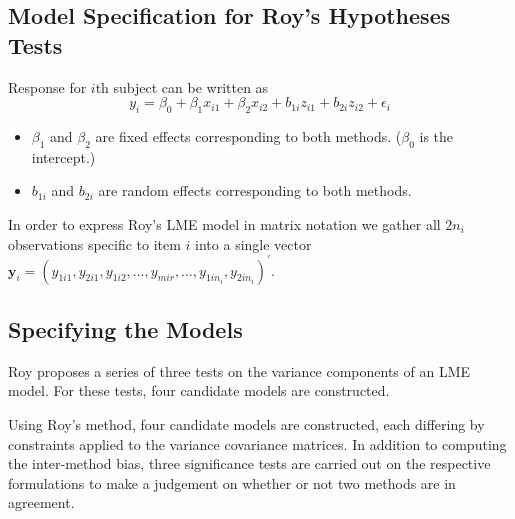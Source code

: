 \documentclass[12pt, a4paper]{report}
\theoremstyle{plain}
\theoremstyle{definition}
\theoremstyle{remark}
\begin{document}

	\subsection{Model Specification for Roy's Hypotheses Tests}
	
	Response for $i$th subject can be written as
	\[ y_i = \beta_0 + \beta_1x_{i1} + \beta_2x_{i2} + b_{1i}z_{i1}  + b_{2i}z_{i2} + \epsilon_i \]
	\begin{itemize}
		\item $\beta_1$ and $\beta_2$ are fixed effects corresponding to both methods. ($\beta_0$ is the intercept.)
		\item $b_{1i}$ and $b_{2i}$ are random effects corresponding to both methods.
	\end{itemize}
	
	
	
	
	
	
	
	In order to express Roy's LME model in matrix notation we gather all $2n_i$ observations specific to item $i$ into a single vector  $\boldsymbol{y}_{i} = (y_{1i1},y_{2i1},y_{1i2},\ldots,y_{mir},\ldots,y_{1in_{i}},y_{2in_{i}})^\prime.$ 
	
	
	
	
	
	
	

	\subsection{Specifying the Models}
	Roy proposes a series of three tests on the variance components of an LME model. For these tests, four candidate models are constructed. 
	
	Using Roy's method, four candidate models are constructed, each differing by constraints applied to the variance covariance matrices. In addition to computing the inter-method bias, three significance tests are carried out on the respective formulations to make a judgement on whether or not two methods are in agreement.
	
\end{document}

